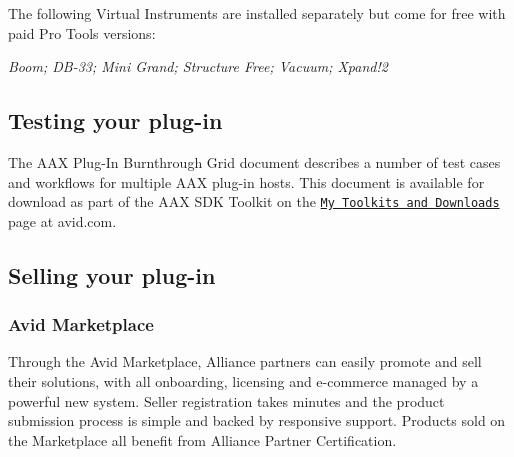 \begin{DoxyItemize}
\begin{DoxyItemize}
The following Virtual Instruments are installed separately but come for free with paid Pro Tools versions\+:


\begin{DoxyItemize}
\item {\itshape Boom; D\+B-\/33; Mini Grand; Structure Free; Vacuum; Xpand!2}  
\end{DoxyItemize}
\end{DoxyItemize}
\end{DoxyItemize}



 \hypertarget{a00372_aax_distributing_testing}{}\subsection{Testing your plug-\/in}\label{a00372_aax_distributing_testing}
 The A\+A\+X Plug-\/\+In Burnthrough Grid document describes a number of test cases and workflows for multiple A\+A\+X plug-\/in hosts. This document is available for download as part of the A\+A\+X S\+D\+K Toolkit on the \href{https://my.avid.com/products/cppsdk}{\tt My Toolkits and Downloads} page at avid.\+com.



 \hypertarget{a00372_aax_distributing_selling}{}\subsection{Selling your plug-\/in}\label{a00372_aax_distributing_selling}
 \hypertarget{a00372_aax_distributing_selling_avidmarketplace}{}\subsubsection{Avid Marketplace}\label{a00372_aax_distributing_selling_avidmarketplace}
 Through the Avid Marketplace, Alliance partners can easily promote and sell their solutions, with all onboarding, licensing and e-\/commerce managed by a powerful new system. Seller registration takes minutes and the product submission process is simple and backed by responsive support. Products sold on the Marketplace all benefit from Alliance Partner Certification.

